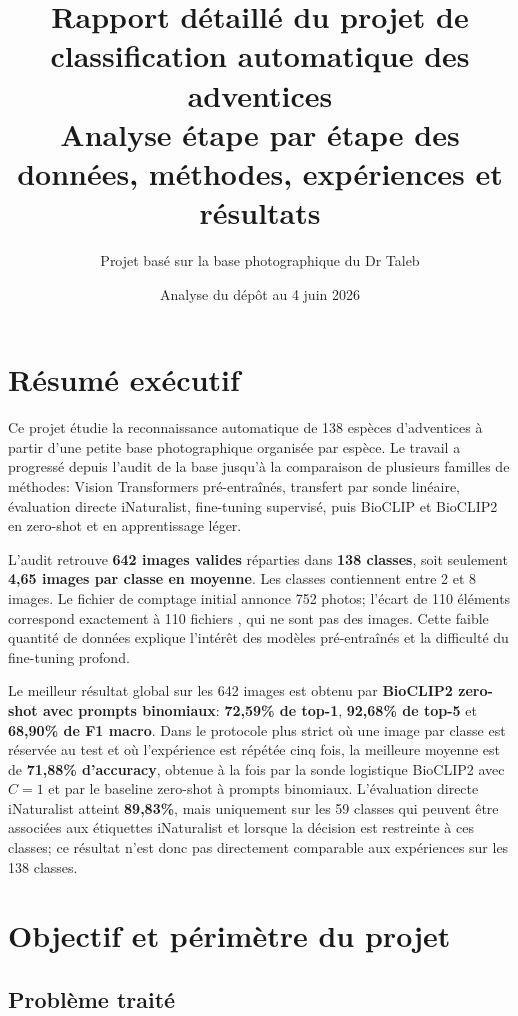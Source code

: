 \documentclass[11pt,a4paper]{report}
\title{\textbf{Rapport détaillé du projet de classification automatique des adventices}\\
\large Analyse étape par étape des données, méthodes, expériences et résultats}
\author{Projet basé sur la base photographique du Dr Taleb}
\date{Analyse du dépôt au 4 juin 2026}
\newcommand{\code}[1]{\texttt{\detokenize{#1}}}
\begin{document}
\maketitle
\tableofcontents
\listoftables

\chapter*{Résumé exécutif}

Ce projet étudie la reconnaissance automatique de 138 espèces d'adventices à partir
d'une petite base photographique organisée par espèce. Le travail a progressé depuis
l'audit de la base jusqu'à la comparaison de plusieurs familles de méthodes:
Vision Transformers pré-entraînés, transfert par sonde linéaire, évaluation directe
iNaturalist, fine-tuning supervisé, puis BioCLIP et BioCLIP2 en zero-shot et en
apprentissage léger.

L'audit retrouve \textbf{642 images valides} réparties dans \textbf{138 classes},
soit seulement \textbf{4,65 images par classe en moyenne}. Les classes contiennent
entre 2 et 8 images. Le fichier de comptage initial annonce 752 photos; l'écart de
110 éléments correspond exactement à 110 fichiers \code{desktop.ini}, qui ne sont
pas des images. Cette faible quantité de données explique l'intérêt des modèles
pré-entraînés et la difficulté du fine-tuning profond.

Le meilleur résultat global sur les 642 images est obtenu par \textbf{BioCLIP2
zero-shot avec prompts binomiaux}: \textbf{72,59\% de top-1}, \textbf{92,68\% de
top-5} et \textbf{68,90\% de F1 macro}. Dans le protocole plus strict où une image
par classe est réservée au test et où l'expérience est répétée cinq fois, la
meilleure moyenne est de \textbf{71,88\% d'accuracy}, obtenue à la fois par la
sonde logistique BioCLIP2 avec $C=1$ et par le baseline zero-shot à prompts
binomiaux. L'évaluation directe iNaturalist atteint \textbf{89,83\%}, mais uniquement
sur les 59 classes qui peuvent être associées aux étiquettes iNaturalist et lorsque
la décision est restreinte à ces classes; ce résultat n'est donc pas directement
comparable aux expériences sur les 138 classes.

\chapter{Objectif et périmètre du projet}

\section{Problème traité}
\end{document}
